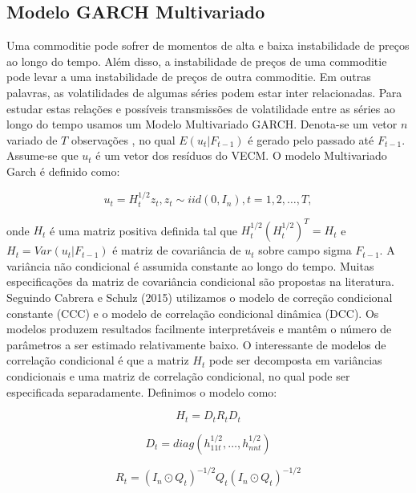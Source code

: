 \documentclass[a4paper,12pt] {article}
\begin{document}
  
  \subsection{Modelo GARCH Multivariado} 
 
 
 Uma commoditie pode  sofrer de momentos de alta e baixa instabilidade de preços ao longo do tempo. Além disso, a instabilidade de preços de uma commoditie pode levar a uma instabilidade de preços de outra commoditie. Em outras palavras, as volatilidades de algumas séries podem estar inter relacionadas.  Para estudar estas relações  e possíveis transmissões  de volatilidade entre as séries ao longo do tempo usamos um Modelo Multivariado GARCH. 
 Denota-se um vetor $n$ variado de $T$ observações , no qual $E(u_t|F_{t-1})$ é gerado pelo passado até $F_{t-1}$. Assume-se que $u_t$ é um vetor dos resíduos do VECM. O modelo Multivariado Garch é definido como:
 
   \begin{equation}
   u_t=H_{t}^{1/2} z_t,  z_t \sim iid(0,I_n), t=1,2,\dots,T,
   \end{equation}
 
  onde $H_t$ é uma matriz positiva definida tal que $H_{t}^{1/2}(H_{t}^{1/2})^T=H_t$ e $H_t=Var(u_t|F_{t-1})$ é  matriz de covariância de $u_t$ sobre campo sigma $F_{t-1}$. A variância não condicional é assumida constante ao longo do tempo. Muitas especificações da matriz de covariância condicional são propostas na literatura. Seguindo Cabrera e Schulz (2015) utilizamos o modelo de correção condicional constante (CCC) e o   modelo de correlação condicional dinâmica (DCC). Os modelos produzem resultados facilmente interpretáveis e mantêm o número de parâmetros a ser estimado relativamente baixo. O interessante de modelos de correlação condicional é que a matriz $H_t$ pode ser decomposta em variâncias condicionais e uma matriz de correlação condicional, no qual pode ser especificada separadamente. Definimos o modelo como:
  
    \begin{equation}
    H_{t}=D_t R_t D_t
    \end{equation}
  
     \begin{equation}
     D_{t}=diag(h_{1 1t}^{1/2},\dots,h_{n nt}^{1/2})
     \end{equation}
 
  \begin{equation}
  R_{t}=(I_n \odot Q_t)^{-1/2} Q_t(I_n \odot Q_t)^{-1/2}
  \end{equation}
 
\end{document}
